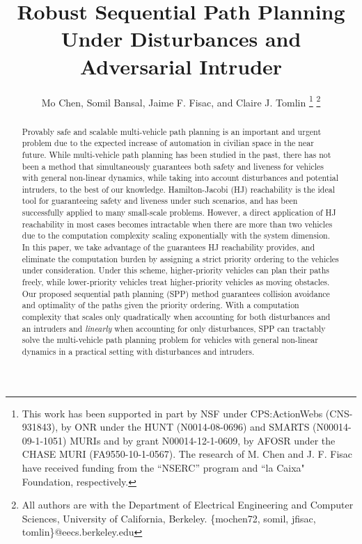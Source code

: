 \documentclass[journal]{IEEEtran}
\title{\LARGE \bf Robust Sequential Path Planning Under Disturbances and Adversarial Intruder}
\author{Mo Chen, Somil Bansal, Jaime F. Fisac, and Claire J. Tomlin
\thanks{This work has been supported in part by NSF under CPS:ActionWebs (CNS-931843), by ONR under the HUNT (N0014-08-0696) and SMARTS (N00014-09-1-1051) MURIs and by grant N00014-12-1-0609, by AFOSR under the CHASE MURI (FA9550-10-1-0567). The research of M. Chen and J. F. Fisac have received funding from the ``NSERC'' program and ``la Caixa" Foundation, respectively.}
\thanks{All authors are with the Department of Electrical Engineering and Computer Sciences, University of California, Berkeley. \{mochen72, somil, jfisac, tomlin\}@eecs.berkeley.edu}
}
\begin{document}
\maketitle
\thispagestyle{empty}
\pagestyle{empty}

\begin{abstract}
Provably safe and scalable multi-vehicle path planning is an important and urgent problem due to the expected increase of automation in civilian space in the near future. While multi-vehicle path planning has been studied in the past, there has not been a method that simultaneously guarantees both safety and liveness for vehicles with general non-linear dynamics, while taking into account disturbances and potential intruders, to the best of our knowledge. Hamilton-Jacobi (HJ) reachability is the ideal tool for guaranteeing safety and liveness under such scenarios, and has been successfully applied to many small-scale problems. However, a direct application of HJ reachability in most cases becomes intractable when there are more than two vehicles due to the computation complexity scaling exponentially with the system dimension. In this paper, we take advantage of the guarantees HJ reachability provides, and eliminate the computation burden by assigning a strict priority ordering to the vehicles under consideration. Under this scheme, higher-priority vehicles can plan their paths freely, while lower-priority vehicles treat higher-priority vehicles as moving obstacles. Our proposed sequential path planning (SPP) method guarantees collision avoidance and optimality of the paths given the priority ordering. With a computation complexity that scales only quadratically when accounting for both disturbances and an intruders and \textit{linearly} when accounting for only disturbances, SPP can tractably solve the multi-vehicle path planning problem for vehicles with general non-linear dynamics in a practical setting with disturbances and intruders. 
\end{abstract}















\end{document}
